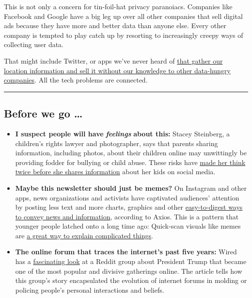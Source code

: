 This is not only a concern for tin-foil-hat privacy paranoiacs.
Companies like Facebook and Google have a big leg up over all other
companies that sell digital ads because they have more and better data
than anyone else. Every other company is tempted to play catch up by
resorting to increasingly creepy ways of collecting user data.

That might include Twitter, or apps we've never heard of
\href{https://www.nytimes3xbfgragh.onion/interactive/2018/12/10/business/location-data-privacy-apps.html}{that
gather our location information and sell it without our knowledge to
other data-hungry companies}. All the tech problems are connected.

\begin{center}\rule{0.5\linewidth}{\linethickness}\end{center}

\hypertarget{before-we-go-}{%
\subsection{Before we go \ldots{}}\label{before-we-go-}}

\begin{itemize}
\item
  \textbf{I suspect people will have} \emph{\textbf{feelings}}
  \textbf{about this:} Stacey Steinberg, a children's rights lawyer and
  photographer, says that parents sharing information, including photos,
  about their children online may unwittingly be providing fodder for
  bullying or child abuse. These risks have
  \href{https://www.nytimes3xbfgragh.onion/2020/08/04/well/family/parents-social-media-privacy.html}{made
  her think twice before she shares information} about her kids on
  social media.
\item
  \textbf{Maybe this newsletter should just be memes?} On Instagram and
  other apps, news organizations and activists have captivated
  audiences' attention by posting less text and more charts, graphics
  and other
  \href{https://www.axios.com/instagram-information-coronavirus-george-floyd-706d1ad3-9d6d-48d4-b085-3469a0d93b56.html}{easy-to-digest
  ways to convey news and information}, according to Axios. This is a
  pattern that younger people latched onto a long time ago: Quick-scan
  visuals like memes are
  \href{https://www.nytimes3xbfgragh.onion/2019/12/24/style/finance-memes.html}{a
  great way to explain complicated things}.
\item
  \textbf{The online forum that traces the internet's past five years:}
  Wired has a
  \href{https://www.wired.com/story/the-hate-fueled-rise-of-rthe-donald-and-its-epic-takedown/}{fascinating
  look} at a Reddit group about President Trump that became one of the
  most popular and divisive gatherings online. The article tells how
  this group's story encapsulated the evolution of internet forums in
  molding or policing people's personal interactions and beliefs.
\end{itemize}

